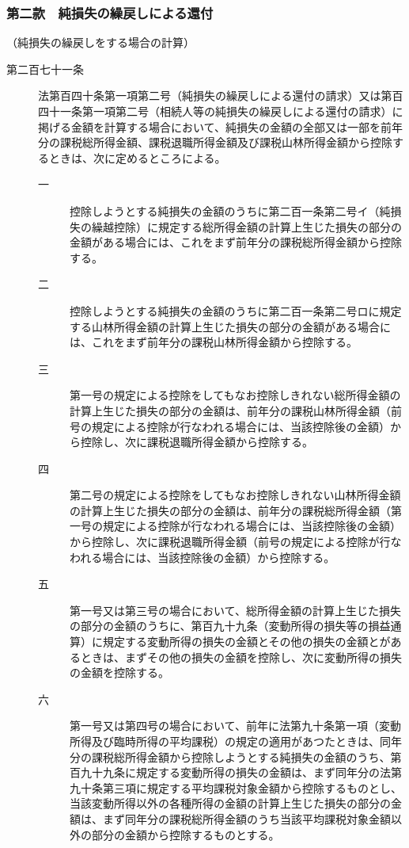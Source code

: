\documentclass[twocolumn,a4j,10pt]{ltjtarticle}
\begin{document}
\subsubsection*{第二款　純損失の繰戻しによる還付}
\noindent\hspace{10pt}（純損失の繰戻しをする場合の計算）
\begin{description}
\item[第二百七十一条]法第百四十条第一項第二号（純損失の繰戻しによる還付の請求）又は第百四十一条第一項第二号（相続人等の純損失の繰戻しによる還付の請求）に掲げる金額を計算する場合において、純損失の金額の全部又は一部を前年分の課税総所得金額、課税退職所得金額及び課税山林所得金額から控除するときは、次に定めるところによる。
\begin{description}
\item[一]控除しようとする純損失の金額のうちに第二百一条第二号イ（純損失の繰越控除）に規定する総所得金額の計算上生じた損失の部分の金額がある場合には、これをまず前年分の課税総所得金額から控除する。
\item[二]控除しようとする純損失の金額のうちに第二百一条第二号ロに規定する山林所得金額の計算上生じた損失の部分の金額がある場合には、これをまず前年分の課税山林所得金額から控除する。
\item[三]第一号の規定による控除をしてもなお控除しきれない総所得金額の計算上生じた損失の部分の金額は、前年分の課税山林所得金額（前号の規定による控除が行なわれる場合には、当該控除後の金額）から控除し、次に課税退職所得金額から控除する。
\item[四]第二号の規定による控除をしてもなお控除しきれない山林所得金額の計算上生じた損失の部分の金額は、前年分の課税総所得金額（第一号の規定による控除が行なわれる場合には、当該控除後の金額）から控除し、次に課税退職所得金額（前号の規定による控除が行なわれる場合には、当該控除後の金額）から控除する。
\item[五]第一号又は第三号の場合において、総所得金額の計算上生じた損失の部分の金額のうちに、第百九十九条（変動所得の損失等の損益通算）に規定する変動所得の損失の金額とその他の損失の金額とがあるときは、まずその他の損失の金額を控除し、次に変動所得の損失の金額を控除する。
\item[六]第一号又は第四号の場合において、前年に法第九十条第一項（変動所得及び臨時所得の平均課税）の規定の適用があつたときは、同年分の課税総所得金額から控除しようとする純損失の金額のうち、第百九十九条に規定する変動所得の損失の金額は、まず同年分の法第九十条第三項に規定する平均課税対象金額から控除するものとし、当該変動所得以外の各種所得の金額の計算上生じた損失の部分の金額は、まず同年分の課税総所得金額のうち当該平均課税対象金額以外の部分の金額から控除するものとする。
\end{description}
\end{description}
\end{document}
